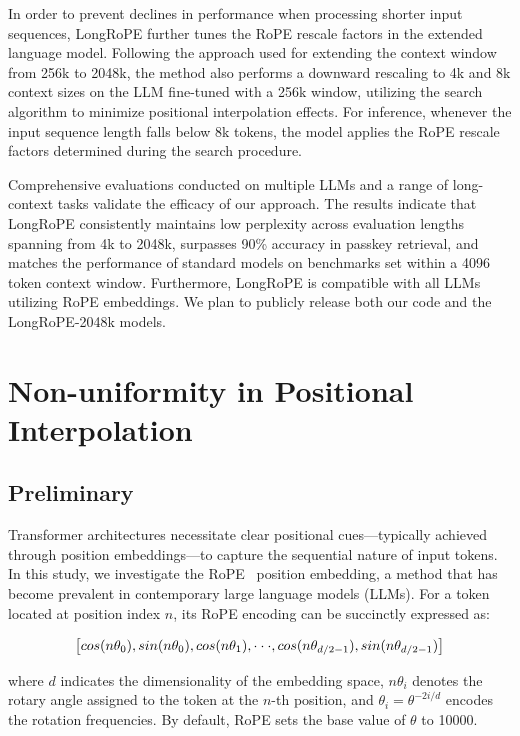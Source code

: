 In order to prevent declines in performance when processing shorter input sequences, {LongRoPE} further tunes the RoPE rescale factors in the extended language model. Following the approach used for extending the context window from 256k to 2048k, the method also performs a downward rescaling to 4k and 8k context sizes on the LLM fine-tuned with a 256k window, utilizing the search algorithm to minimize positional interpolation effects. For inference, whenever the input sequence length falls below 8k tokens, the model applies the RoPE rescale factors determined during the search procedure.

Comprehensive evaluations conducted on multiple LLMs and a range of long-context tasks validate the efficacy of our approach. The results indicate that LongRoPE consistently maintains low perplexity across evaluation lengths spanning from 4k to 2048k, surpasses 90\% accuracy in passkey retrieval, and matches the performance of standard models on benchmarks set within a 4096 token context window. Furthermore, LongRoPE is compatible with all LLMs utilizing RoPE embeddings. We plan to publicly release both our code and the LongRoPE-2048k models.

\section{Non-uniformity in Positional Interpolation}
\label{sec:analysis}

\subsection{Preliminary}

Transformer architectures necessitate clear positional cues—typically achieved through position embeddings—to capture the sequential nature of input tokens. In this study, we investigate the RoPE~\cite{rope} position embedding, a method that has become prevalent in contemporary large language models (LLMs). For a token located at position index $n$, its RoPE encoding can be succinctly expressed as:

\begin{equation}
		\fontsize{7.8}{7.8} \selectfont
	\label{eq:rope}
	\left[ cos(n\theta_0), sin(n\theta_0), cos(n\theta_1), \cdot\cdot\cdot, cos(n\theta_{d/2-1}), sin(n\theta_{d/2-1}) \right]   
\end{equation}

where $d$ indicates the dimensionality of the embedding space, 
$n\theta_i$ denotes the rotary angle assigned to the token at the $n$-th position, 
and $\theta_i = \theta^{-2i/d}$ encodes the rotation frequencies. By default, RoPE sets the base value of $\theta$ to 10000.

